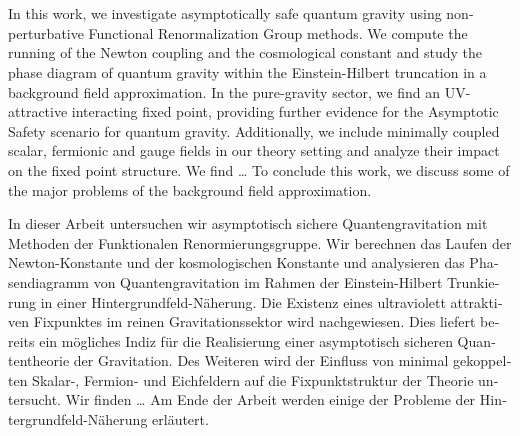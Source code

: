 {\hypersetup{allcolors=black}
\thispagestyle{plain}

\makeatletter

\begin{center}
\textbf{\large\@title} \\
\vspace{.1cm}
\@author \\
\end{center}

\makeatother

In this work, we investigate asymptotically  safe quantum gravity using non-perturbative Functional Renormalization Group methods. We compute the running of the Newton coupling and the cosmological constant and study the phase diagram of quantum gravity within the Einstein-Hilbert truncation in a background field approximation. In the pure-gravity sector, we find an UV-attractive interacting fixed point, providing further evidence for the Asymptotic Safety scenario for quantum gravity. Additionally, we include minimally coupled scalar, fermionic and gauge fields in our theory setting and analyze their impact on the fixed point structure. We find \dots %
To conclude this work, we discuss some of the major problems of the background field approximation.


\vfill

\begin{otherlanguage}{german}
In dieser Arbeit untersuchen wir asymptotisch sichere Quantengravitation mit Methoden der Funktionalen Renormierungsgruppe. Wir berechnen das Laufen der Newton-Konstante und der kosmologischen Konstante und analysieren das Phasendiagramm von Quantengravitation im Rahmen der Einstein-Hilbert Trunkierung in einer Hintergrundfeld-N\"aherung. Die Existenz eines ultraviolett attraktiven Fixpunktes im reinen Gravitationssektor wird nachgewiesen. Dies liefert bereits ein m\"ogliches Indiz f\"ur die Realisierung einer asymptotisch sicheren Quantentheorie der Gravitation. Des Weiteren wird der Einfluss von minimal gekoppelten Skalar-, Fermion- und Eichfeldern auf die Fixpunktstruktur der Theorie untersucht. Wir finden \dots %
Am Ende der Arbeit werden einige der Probleme der Hintergrundfeld-N\"aherung erl\"autert.
\end{otherlanguage}
\vfill
\cleardoublepage}
